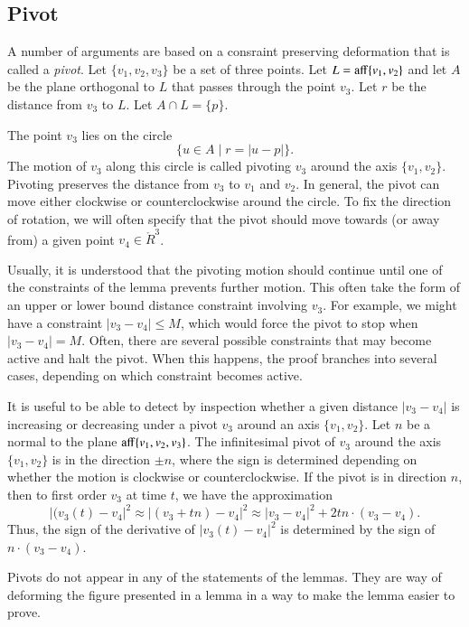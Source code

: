 \begin{tarskidata}
\section{Pivot}

A number of arguments are based on a consraint preserving deformation
that is called a {\it pivot}.    Let $\{v_1,v_2,v_3\}$ be a set
of three points.  Let $L={\operatorname{aff}}\{v_1,v_2\}$ and let $A$ be
the plane orthogonal to $L$ that passes through the point $v_3$.
Let $r$ be the distance from $v_3$ to $L$.  Let $A\cap L = \{p\}$.

The point $v_3$ lies on the circle
   $$
   \{u \in A \mid r = |u - p|\}.
   $$
The motion of $v_3$ along this circle is called pivoting $v_3$
around the axis $\{v_1,v_2\}$.   Pivoting preserves the distance from
$v_3$ to $v_1$ and $v_2$.   In general, the pivot can move
either clockwise or counterclockwise around the circle.  To fix
the direction of rotation, we will often specify that the pivot
should move towards (or away from) a given point $v_4\in\ring{R}^3$.



Usually, it is understood that the pivoting motion should continue
until one of the constraints of the lemma prevents further motion.
This often take the form of an upper or lower bound distance
constraint involving $v_3$.  For example, we might have a constraint
$|v_3-v_4|\le M$, which would force the pivot to stop when $|v_3-v_4|=M$.
Often, there are several possible constraints that may become active
and halt the pivot.  When this happens, the proof branches into several
cases, depending on which constraint becomes active.

It is useful to be able to detect by inspection whether a given
distance $|v_3-v_4|$ is increasing or decreasing under a pivot $v_3$
around an axis $\{v_1,v_2\}$.  Let $n$ be a normal to the plane
${\operatorname{aff}}\{v_1,v_2,v_3\}$.  The infinitesimal pivot of $v_3$ 
around the axis $\{v_1,v_2\}$ is in the direction $\pm n$, where
the sign is determined depending on whether the motion is clockwise
or counterclockwise.    If the pivot is in direction $n$, 
then to first order $v_3$ at time $t$, we have the approximation
  $$
  |(v_3(t)-v_4|^2 \approx |(v_3+t n)-v_4|^2 
  \approx |v_3-v_4|^2 + 2 t n \cdot (v_3-v_4).
  $$
Thus, the sign of the derivative of $|v_3(t)-v_4|^2$ is determined by the
sign of $n\cdot (v_3-v_4)$.


Pivots do not appear in any of the statements of the lemmas.  They
are way of deforming the figure presented in a lemma in a way to make
the lemma easier to prove.








\end{tarskidata}
